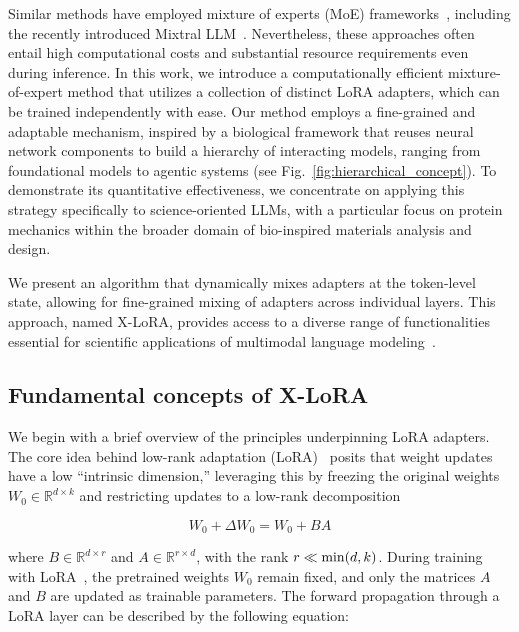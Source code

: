 Similar methods have employed mixture of experts (MoE) frameworks~\cite{Jacobs1991AdaptiveExperts,Hampshire1992TheRecognition,Jordan1994HierarchicalAlgorithm}, including the recently introduced Mixtral LLM~\cite{Jiang2024MixtralExperts}. Nevertheless, these approaches often entail high computational costs and substantial resource requirements even during inference. In this work, we introduce a computationally efficient mixture-of-expert method that utilizes a collection of distinct LoRA adapters, which can be trained independently with ease. Our method employs a fine-grained and adaptable mechanism, inspired by a biological framework that reuses neural network components to build a hierarchy of interacting models, ranging from foundational models to agentic systems (see Fig.~\ref{fig:hierarchical_concept}). To demonstrate its quantitative effectiveness, we concentrate on applying this strategy specifically to science-oriented LLMs, with a particular focus on protein mechanics within the broader domain of bio-inspired materials analysis and design.

We present an algorithm that dynamically mixes adapters at the token-level state, allowing for fine-grained mixing of adapters across individual layers. This approach, named X-LoRA, provides access to a diverse range of functionalities essential for scientific applications of multimodal language modeling~\cite{Hu2023DeepScience,Buehler2023AMetamaterials,Buehler2022ProteinNetworks}.

\subsection{Fundamental concepts of X-LoRA}

We begin with a brief overview of the principles underpinning LoRA adapters. The core idea behind low-rank adaptation (LoRA)~\cite{hu2021lora} posits that weight updates have a low “intrinsic dimension,” leveraging this by freezing the original weights $W_0 \in \mathbb{R}^{d \times k}$ and restricting updates to a low-rank decomposition

\begin{equation}
W_0 + \Delta W_0 = W_0 + BA 
\end{equation}

where $B \in \mathbb{R}^{d \times r}$ and $A \in \mathbb{R}^{r \times d}$, with the rank $r \ll {\rm min}(d,k)$. During training with LoRA~\cite{hu2021lora}, the pretrained weights $W_0$ remain fixed, and only the matrices $A$ and $B$ are updated as trainable parameters. The forward propagation through a LoRA layer can be described by the following equation:

